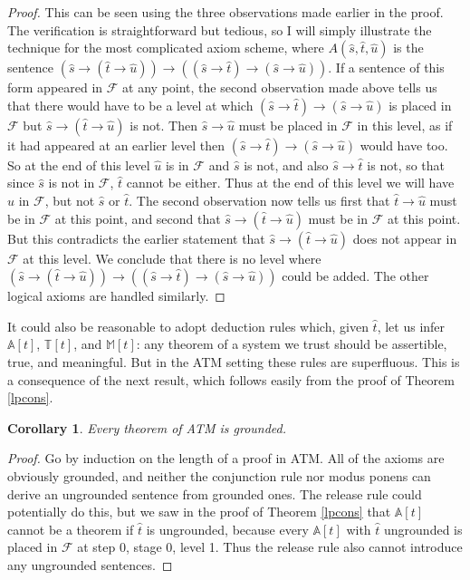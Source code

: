 \documentclass{amsart}
\newtheorem{corollary}{Corollary}[section]
\theoremstyle{definition}
\begin{document}
\begin{proof}
  This can be seen using the three observations made earlier in the proof. The verification is straightforward but tedious, so I will simply illustrate the technique for the most complicated axiom scheme,
  where $A(\hat{s}, \hat{t}, \hat{u})$ is the sentence $(\hat{s} \to (\hat{t} \to \hat{u})) \to ((\hat{s} \to \hat{t})
  \to (\hat{s} \to \hat{u}))$. If a sentence of this form
  appeared in $\mathcal{F}$ at any point,
  the second observation made above tells us that there would have to be a level at which $(\hat{s} \to \hat{t}) \to
  (\hat{s} \to \hat{u})$ is placed in $\mathcal{F}$ but $\hat{s} \to (\hat{t} \to \hat{u})$ is not. Then
  $\hat{s} \to \hat{u}$ must be placed in $\mathcal{F}$ in this level, as if it had appeared at an earlier level
  then $(\hat{s} \to \hat{t}) \to (\hat{s} \to \hat{u})$ would have too. So at the end of
  this level $\hat{u}$ is in $\mathcal{F}$ and $\hat{s}$ is not, and also $\hat{s} \to \hat{t}$ is not,
  so that since $\hat{s}$ is not in $\mathcal{F}$, $\hat{t}$ cannot be either. Thus at the end of this level we
  will have $\hat{u}$ in $\mathcal{F}$, but not $\hat{s}$ or $\hat{t}$. The second observation now tells us first that
  $\hat{t} \to \hat{u}$ must be in $\mathcal{F}$ at this point, and second that $\hat{s} \to (\hat{t} \to \hat{u})$ must
  be in $\mathcal{F}$ at this point. But this contradicts the earlier statement that
  $\hat{s} \to (\hat{t} \to \hat{u})$ does not appear in $\mathcal{F}$ at this level. We conclude that
  there is no level where $(\hat{s} \to (\hat{t} \to \hat{u})) \to ((\hat{s} \to \hat{t})
  \to (\hat{s} \to \hat{u}))$ could be added. The other logical axioms are handled similarly.
\end{proof}

It could also be reasonable to adopt deduction rules which, given $\hat{t}$, let us infer $\mathbb{A}[t]$, $\mathbb{T}[t]$, and $\mathbb{M}[t]$: any theorem of a system we trust should be assertible, true, and meaningful. But in the ATM setting these rules are superfluous. This is a consequence of the next result, which follows easily from the proof of Theorem \ref{lpcons}.

\begin{corollary}\label{lpcor}
  Every theorem of ATM is grounded.
\end{corollary}

\begin{proof}
  Go by induction on the length of a proof in ATM. All of the axioms are obviously grounded, and neither the
  conjunction rule nor modus ponens can derive an ungrounded sentence from grounded ones. The release rule
  could potentially do this, but we saw in the proof of Theorem \ref{lpcons} that $\mathbb{A}[t]$ cannot be
  a theorem if $\hat{t}$ is ungrounded, because every $\mathbb{A}[t]$ with $\hat{t}$ ungrounded is placed in
  $\mathcal{F}$ at step 0, stage 0, level 1. Thus the release rule also cannot introduce any ungrounded sentences.
\end{proof}
\end{document}
